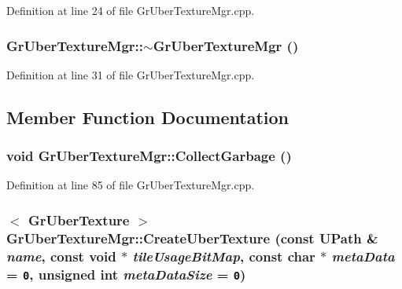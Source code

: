 Definition at line 24 of file GrUberTextureMgr.cpp.\hypertarget{class_gr_uber_texture_mgr_4ab7c838a075752a8b9288a787f88c3f}{
\subsubsection[{$\sim$GrUberTextureMgr}]{\setlength{\rightskip}{0pt plus 5cm}GrUberTextureMgr::$\sim$GrUberTextureMgr ()}}
\label{class_gr_uber_texture_mgr_4ab7c838a075752a8b9288a787f88c3f}




Definition at line 31 of file GrUberTextureMgr.cpp.

\subsection{Member Function Documentation}
\hypertarget{class_gr_uber_texture_mgr_84abd636d04889498494d3edc9140260}{
\subsubsection[{CollectGarbage}]{\setlength{\rightskip}{0pt plus 5cm}void GrUberTextureMgr::CollectGarbage ()}}
\label{class_gr_uber_texture_mgr_84abd636d04889498494d3edc9140260}




Definition at line 85 of file GrUberTextureMgr.cpp.\hypertarget{class_gr_uber_texture_mgr_5b50e74d5a3b89b7fe22adc1731bca14}{
\subsubsection[{CreateUberTexture}]{$<$ {\bf GrUberTexture} $>$ GrUberTextureMgr::CreateUberTexture (const {\bf UPath} \& {\em name}, \/  const void $\ast$ {\em tileUsageBitMap}, \/  const char $\ast$ {\em metaData} = {\tt 0}, \/  unsigned int {\em metaDataSize} = {\tt 0})}}
\label{class_gr_uber_texture_mgr_5b50e74d5a3b89b7fe22adc1731bca14}




